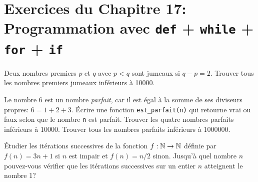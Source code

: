 \section*{Exercices du Chapitre 17: Programmation avec \texttt{def} + \texttt{while} +
\texttt{for} + \texttt{if}}

\begin{question}
Deux nombres premiers $p$ et $q$ avec $p<q$ sont jumeaux si $q-p=2$. Trouver
tous les nombres premiers jumeaux inférieurs à 10000.
\end{question}

\begin{question}
Le nombre 6 est un nombre \emph{parfait}, car il est égal à la somme de ses
diviseurs propres: $6=1+2+3$. Écrire une fonction \texttt{est\_parfait(n)} qui
retourne vrai ou faux selon que le nombre \texttt{n} est parfait.
Trouver les quatre nombres parfaits inférieurs à 10000. Trouver tous les nombres
parfaits inférieurs à 1000000.
\end{question}






\begin{question}
Étudier les itérations successives de la fonction $f : \mathbb{N} \rightarrow \mathbb{N}$ définie par
$f(n) = 3n+1$ si $n$ est impair
et $f(n) = n/2$ sinon.
Jusqu'à quel nombre $n$ pouvez-vous vérifier que les itérations successives
sur un entier $n$ atteignent le nombre 1?
\end{question}



